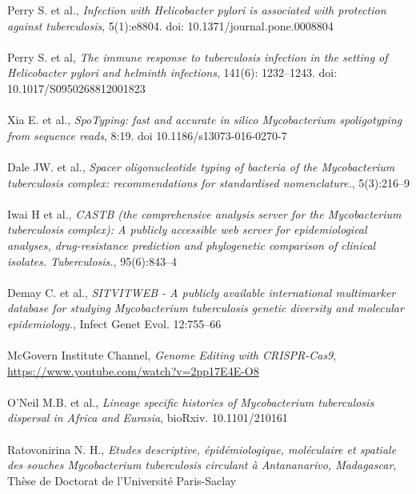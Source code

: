 \documentclass[twoside,a4paper,11pt,frenchb,openany]{report}
\begin{document}
\begin{spacing}{0.5}
\begin{thebibliography}{10}
Perry S. et al., \textit{Infection with Helicobacter pylori is associated with protection against tuberculosis}, 5(1):e8804. doi: 10.1371/journal.pone.0008804\\ \\

Perry S. et al, \textit{The immune response to tuberculosis infection in the setting of Helicobacter pylori and helminth infections}, 141(6): 1232–1243. doi: 10.1017/S0950268812001823\\ \\

Xia E. et al., \textit{SpoTyping: fast and accurate in silico Mycobacterium spoligotyping from sequence reads}, 8:19. doi 10.1186/s13073-016-0270-7\\ \\ 

Dale JW. et al., \textit{Spacer oligonucleotide typing of bacteria of the Mycobacterium tuberculosis complex: recommendations for standardised nomenclature.}, 5(3):216–9\\ \\

Iwai H et al., \textit{CASTB (the comprehensive analysis server for the Mycobacterium tuberculosis complex): A publicly accessible web server for epidemiological analyses, drug-resistance prediction and phylogenetic comparison of clinical isolates. Tuberculosis.}, 95(6):843–4\\ \\

Demay C. et al., \textit{SITVITWEB - A publicly available international multimarker database for studying Mycobacterium tuberculosis genetic diversity and molecular epidemiology.}, Infect Genet Evol. 12:755–66\\ \\

\bibitem{}McGovern Institute Channel, \textit{Genome Editing with CRISPR-Cas9}, \url{https://www.youtube.com/watch?v=2pp17E4E-O8}\\ \\

O'Neil M.B. et al., \textit{Lineage specific histories of Mycobacterium tuberculosis dispersal in Africa and Eurasia}, bioRxiv. 10.1101/210161\\ \\

Ratovonirina N. H., \textit{Etudes descriptive, épidémiologique, moléculaire et spatiale des souches Mycobacterium tuberculosis circulant à Antananarivo, Madagascar}, Thèse de Doctorat de l'Université Paris-Saclay\\ \\


\end{thebibliography}
\end{spacing}
\end{document}

